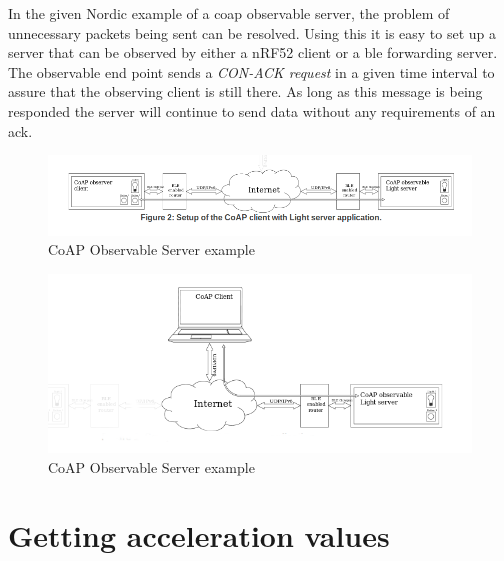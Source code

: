 In the given Nordic example of a \gls{coap} observable server, the problem of unnecessary packets being sent can be resolved. Using this it is easy to set up a server that can be observed by either a nRF52 client or a \gls{ble} forwarding server. The observable end point sends a \textit{CON-ACK request} in a given time interval to assure that the observing client is still there. As long as this message is being responded the server will continue to send data without any requirements of an \gls{ack}. 

\begin{figure}[ht]
    \centering
    \includegraphics[scale=0.47]{CoAPObservalbFigure2.png}    
    \caption{CoAP Observable Server example \cite{nordicNrfDocumentation}}
    \label{fig:CoAPexample2}
\end{figure}


\begin{figure}[ht]
    \centering
    \includegraphics[scale=0.47]{CoAPObservableServerExample2.png}    
    \caption{CoAP Observable Server example \cite{nordicNrfDocumentation}}
    \label{fig:CoAPexample3}
\end{figure}








\section{Getting acceleration values}

